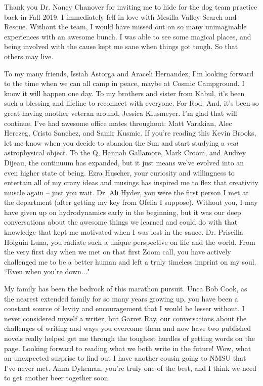 Thank you Dr. Nancy Chanover for inviting me to hide for the dog team practice back in Fall 2019.
I immediately fell in love with Mesilla Valley Search and Rescue.
Without the team, I would have missed out on so many unimaginable experiences with an awesome bunch.
I was able to see some magical places, and being involved with the cause kept me sane when things got tough.
So that others may live.

To my many friends, 
Issiah Astorga and Araceli Hernandez, I'm looking forward to the time when we can all camp in peace, maybe at Cosmic Campground.
I know it will happen one day.
To my brothers and sister from Kabul, it's been such a blessing and lifeline to reconnect with everyone.
For Rod.
And, it's been so great having another veteran around, Jessica Klusmeyer.
I'm glad that will continue.
I've had awesome office mates throughout: Matt Varakian, Alec Herczeg, Cristo Sanchez, and Samir Kusmic.
If you're reading this Kevin Brooks, let me know when you decide to abandon the Sun and start studying a \emph{real} astrophysical object.
To the Q, Hannah Gallamore, Mark Croom, and Audrey Dijeau, the continuum has expanded, but it just means we've evolved into an even higher state of being.
Ezra Huscher, your curiosity and willingness to entertain all of my crazy ideas and musings has inspired me to flex that creativity muscle again -- just you wait.
Dr. Ali Hyder, you were the first person I met at the department (after getting my key from Ofelia I suppose).
Without you, I may have given up on hydrodynamics early in the beginning, but it was our deep conversations about the awesome things we learned and could do with that knowledge that kept me motivated when I was lost in the sauce.
Dr. Priscilla Holguin Luna, you radiate such a unique perspective on life and the world.
From the very first day when we met on that first Zoom call, you have actively challenged me to be a better human and left a truly timeless imprint on my soul.
``Even when you're down..."

My family has been the bedrock of this marathon pursuit.
Unca Bob Cook, as the nearest extended family for so many years growing up, you have been a constant source of levity and encouragement that I would be lesser without.
I never considered myself a writer, but Garret Ray, our conversations about the challenges of writing and ways you overcome them and now have two published novels really helped get me through the toughest hurdles of getting words on the page.
Looking forward to reading what we both write in the future!
Wow, what an unexpected surprise to find out I have another cousin going to NMSU that I've never met.
Anna Dykeman, you're truly one of the best, and I think we need to get another beer together soon. 

